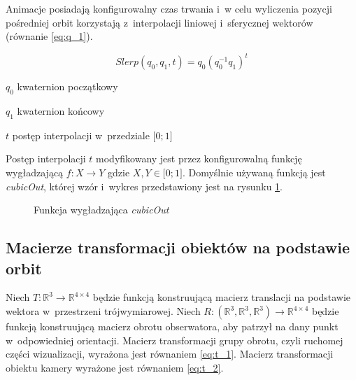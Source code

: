 Animacje posiadają konfigurowalny czas trwania i~w celu wyliczenia pozycji pośredniej orbit korzystają z~interpolacji liniowej i~sferycznej\cite{Slerp} wektorów (równanie \ref{eq:q_1}).
\begin{samepage}
    \begin{equation}
      \label{eq:q_1}
        Slerp (q_0, q_1, t) = q_0(q_0^{-1} q_1)^t
    \end{equation}
    \begin{eqexpl}[25mm]
        \item {$q_0$} kwaternion początkowy
        \item {$q_1$} kwaternion końcowy
        \item {$t$} postęp interpolacji w~przedziale $\lbrack0;1\rbrack$
    \end{eqexpl}
    \vspace{\baselineskip}
\end{samepage}
\begin{multicols}{2}
    
    Postęp interpolacji $t$ modyfikowany jest przez konfigurowalną funkcję wygładzającą \mbox{$f: X \to Y$} gdzie \mbox{$X, Y \in \lbrack0;1\rbrack$}. Domyślnie używaną funkcją jest \textit{cubicOut}, której wzór i~wykres przedstawiony jest na rysunku \ref{fig:ease_1}.
    
    \columnbreak

    \begin{figure}[H]
        \centering
        \caption{Funkcja wygładzająca \textit{cubicOut}}
        \label{fig:ease_1}
    \end{figure}
    
\end{multicols}

\subsection{Macierze transformacji obiektów na podstawie orbit}

Niech $T : \mathbb{R}^3 \to \mathbb{R}^{4\times4}$ będzie funkcją konstruującą macierz translacji na podstawie wektora w~przestrzeni trójwymiarowej. Niech $R : (\mathbb{R}^3, \mathbb{R}^3, \mathbb{R}^3) \to \mathbb{R}^{4\times4}$ będzie funkcją konstruującą macierz obrotu obserwatora, aby patrzył na dany punkt w~odpowiedniej orientacji. Macierz transformacji grupy obrotu, czyli ruchomej części wizualizacji, wyrażona jest równaniem \ref{eq:t_1}. Macierz transformacji obiektu kamery wyrażone jest równaniem \ref{eq:t_2}.

